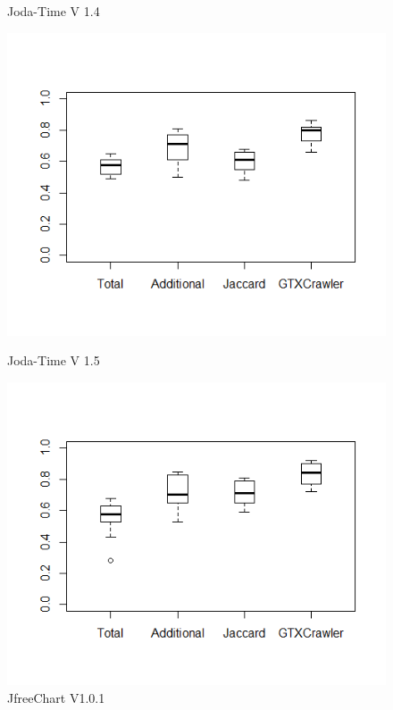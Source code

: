 \begin{figure}[!hb]
	\caption*{Joda-Time V 1.4}
	\label{fig:joda5}
	\endminipage\hfill
\end{figure}

\begin{figure}[!hb]
	\includegraphics[width=0.95\linewidth]{./joda6.png}
	\caption*{Joda-Time V 1.5}
	\label{fig:joda6}
	\endminipage\hfill
	\includegraphics[width=0.95\linewidth]{./jfree1.png}
	\caption*{JfreeChart V1.0.1}
	\label{fig:jfree1}
	\endminipage\hfill		

\end{figure}

